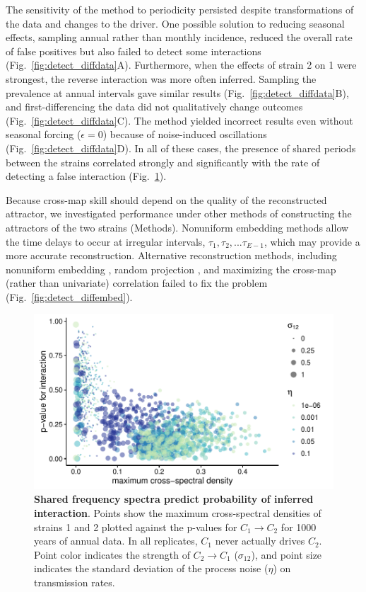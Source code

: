 The sensitivity of the method to periodicity persisted despite transformations of the data and changes to the  driver. 
One possible solution to reducing seasonal effects, sampling annual rather than monthly incidence, reduced the overall rate of false positives but also failed to detect some interactions (Fig.~\ref{fig:detect_diffdata}A).
Furthermore, when the effects of strain 2 on 1 were strongest, the reverse interaction was more often inferred.
Sampling the prevalence at annual intervals gave similar results (Fig.~\ref{fig:detect_diffdata}B), and first-differencing the data did not qualitatively change outcomes (Fig.~\ref{fig:detect_diffdata}C).
The method yielded incorrect results even without seasonal forcing ($\epsilon=0$) because of noise-induced oscillations (Fig.~\ref{fig:detect_diffdata}D).
In all of these cases, the presence of shared periods between the strains correlated strongly and significantly with the rate of detecting a false interaction (Fig.~\ref{fig:max_crossspec_tmp}).

Because cross-map skill should depend on the quality of the reconstructed attractor, we investigated performance under other methods of constructing the attractors of the two strains (Methods).
Nonuniform embedding methods allow the time delays to occur at irregular intervals, $\tau_1, \tau_2, ... \tau_{E-1}$, which may provide a more accurate reconstruction.
Alternative reconstruction methods, including nonuniform embedding \cite{Nichkawde2013, Uzal2011}, random projection \cite{Tajima2015}, and maximizing the cross-map (rather than univariate) correlation failed to fix the problem (Fig.~\ref{fig:detect_diffembed}).

\begin{figure}
\begin{center}
  \includegraphics[width=6in]{dataflow/out/fig_spectra/fig_spectra.pdf}
  \end{center}
  \caption{\textbf{Shared frequency spectra predict probability of inferred interaction}. Points show the maximum cross-spectral densities of strains 1 and 2 plotted against the p-values for $C_1 \rightarrow C_2$ for 1000 years of annual data. In all replicates, $C_1$ never actually drives $C_2$. Point color indicates the strength of $C_2 \rightarrow C_1$ ($\sigma_{12}$), and point size indicates the standard deviation of the process noise ($\eta$) on transmission rates. \label{fig:max_crossspec_tmp}} 
\end{figure}

